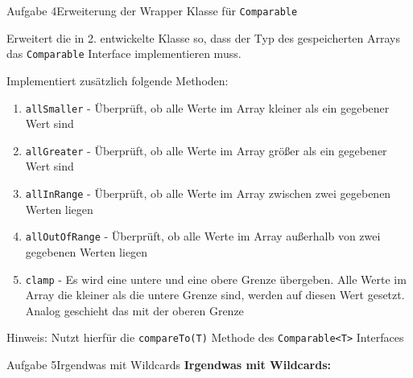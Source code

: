 \begin{frame}[allowframebreaks]{Aufgabe 4}{Erweiterung der Wrapper Klasse für \texttt{Comparable}}
    
    Erweitert die in 2. entwickelte Klasse so, dass der Typ des gespeicherten Arrays das \texttt{Comparable} Interface implementieren muss.
    
    Implementiert zusätzlich folgende Methoden:
    \begin{enumerate}
        \item \texttt{allSmaller} - Überprüft, ob alle Werte im Array kleiner als ein gegebener Wert sind
        \item \texttt{allGreater} - Überprüft, ob alle Werte im Array größer als ein gegebener Wert sind
        \item \texttt{allInRange} - Überprüft, ob alle Werte im Array zwischen zwei gegebenen Werten liegen
        \item \texttt{allOutOfRange} - Überprüft, ob alle Werte im Array außerhalb von zwei gegebenen Werten liegen
        \item \texttt{clamp} - Es wird eine untere und eine obere Grenze übergeben. Alle Werte im Array die kleiner als die untere Grenze sind, werden auf diesen Wert gesetzt. Analog geschieht das mit der oberen Grenze
    \end{enumerate}
    
    Hinweis: Nutzt hierfür die \texttt{compareTo(T)} Methode des \texttt{Comparable<T>} Interfaces
\end{frame}

\begin{frame}{Aufgabe 5}{Irgendwas mit Wildcards}
    \textbf{Irgendwas mit Wildcards:}
\end{frame}